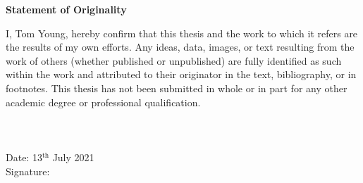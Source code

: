 \documentclass[main.tex]{subfiles}
\begin{document}
	\newpage
	
	

	\begin{center}
		{\bfseries\Large \textsf{Statement of Originality}}
	\end{center}
	I, Tom Young, hereby confirm that this thesis and the work to which it refers are the results of my own efforts. Any ideas, data, images, or text resulting from the work of others (whether published or unpublished) are fully identified as such within the work and attributed to their originator in the text, bibliography, or in footnotes. This thesis has not been submitted in whole or in part for any other academic degree or professional qualification.\\
	\ \\
	\ \\
	\ \\
	\vspace{1.5cm}
	Date:  13${}^\text{th}$ July 2021\\
	\vspace{1.5cm}
	Signature:
	
	
	\newpage
	
	


\end{document}
